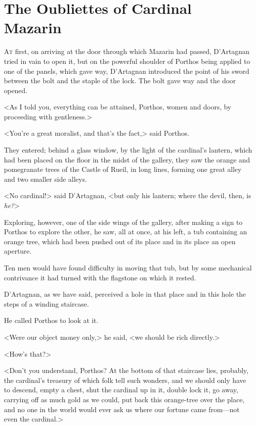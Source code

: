 \chapter{The Oubliettes of Cardinal Mazarin}

 \lettrine{A}{t} first, on arriving at the door through which Mazarin had passed, D'Artagnan tried in vain to open it, but on the powerful shoulder of Porthos being applied to one of the panels, which gave way, D'Artagnan introduced the point of his sword between the bolt and the staple of the lock. The bolt gave way and the door opened.

<As I told you, everything can be attained, Porthos, women and doors, by proceeding with gentleness.>

<You're a great moralist, and that's the fact,> said Porthos.

They entered; behind a glass window, by the light of the cardinal's lantern, which had been placed on the floor in the midst of the gallery, they saw the orange and pomegranate trees of the Castle of Rueil, in long lines, forming one great alley and two smaller side alleys.

<No cardinal!> said D'Artagnan, <but only his lantern; where the devil, then, is \emph{he?}>

Exploring, however, one of the side wings of the gallery, after making a sign to Porthos to explore the other, he saw, all at once, at his left, a tub containing an orange tree, which had been pushed out of its place and in its place an open aperture.

Ten men would have found difficulty in moving that tub, but by some mechanical contrivance it had turned with the flagstone on which it rested.

D'Artagnan, as we have said, perceived a hole in that place and in this hole the steps of a winding staircase.

He called Porthos to look at it.

<Were our object money only,> he said, <we should be rich directly.>

<How's that?>

<Don't you understand, Porthos? At the bottom of that staircase lies, probably, the cardinal's treasury of which folk tell such wonders, and we should only have to descend, empty a chest, shut the cardinal up in it, double lock it, go away, carrying off as much gold as we could, put back this orange-tree over the place, and no one in the world would ever ask us where our fortune came from—not even the cardinal.>

